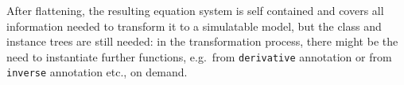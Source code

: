 \begin{nonnormative}
After flattening, the resulting equation system is self
contained and covers all information needed to transform it to a
simulatable model, but the class and instance trees are still needed: in
the transformation process, there might be the need to instantiate
further functions, e.g.\ from \lstinline!derivative! annotation or from \lstinline!inverse!
annotation etc., on demand.
\end{nonnormative}
